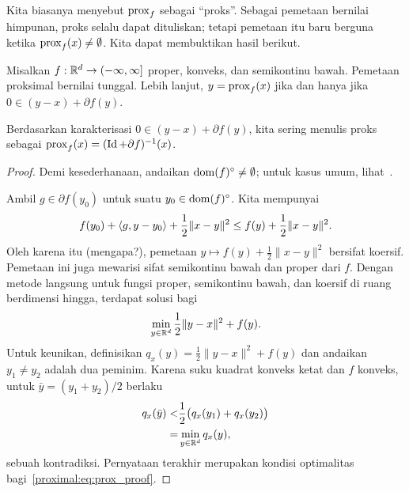 Kita biasanya menyebut \(\mathrm{prox}_f\) sebagai \enquote{proks}. Sebagai pemetaan bernilai himpunan, proks selalu dapat dituliskan; tetapi pemetaan itu baru berguna ketika \(\mathrm{prox}_f(x)\neq\emptyset\). Kita dapat membuktikan hasil berikut.

\begin{lemma}
    Misalkan \(f:\mathbb{R}^d\rightarrow(-\infty,\infty]\) proper, konveks, dan semikontinu bawah. Pemetaan proksimal bernilai tunggal. Lebih lanjut, \(y=\mathrm{prox}_f(x)\) jika dan hanya jika \(0\in(y-x)+\partial f(y)\).
\end{lemma}
\begin{rem}
    Berdasarkan karakterisasi \(0\in(y-x)+\partial f(y)\), kita sering menulis proks sebagai \(\mathrm{prox}_f(x)=(\operatorname{\mathrm{Id}}+\partial f)^{-1}(x)\).
\end{rem}
\begin{proof}
    Demi kesederhanaan, andaikan \(\operatorname{\mathrm{dom}}(f)^\circ\neq\emptyset\); untuk kasus umum, lihat~\cite{beck2017first}.

    Ambil \(g\in\partial f(y_0)\) untuk suatu \(y_0\in\operatorname{\mathrm{dom}}(f)^\circ\). Kita mempunyai
    \begin{equation}
        f(y_0)+\left\langle g , y-y_0\right\rangle+\frac{1}{2}\|x-y\|^2
        \leq f(y)+\frac{1}{2}\|x-y\|^2.
    \end{equation}
    Oleh karena itu (mengapa?), pemetaan \(y\mapsto f(y)+\frac{1}{2}\|x-y\|^2\) bersifat koersif. Pemetaan ini juga mewarisi sifat semikontinu bawah dan proper dari \(f\). Dengan metode langsung untuk fungsi proper, semikontinu bawah, dan koersif di ruang berdimensi hingga, terdapat solusi bagi
    \begin{equation}\label{proximal:eq:prox_proof}
        \min_{y\in\mathbb{R}^d}\frac{1}{2}\|y-x\|^2+f(y).
    \end{equation}
    Untuk keunikan, definisikan \(q_x(y)=\frac{1}{2}\|y-x\|^2+f(y)\) dan andaikan \(y_1\neq y_2\) adalah dua peminim. Karena suku kuadrat konveks ketat dan \(f\) konveks, untuk \(\bar y=(y_1+y_2)/2\) berlaku
    \begin{equation}
        \begin{aligned}
            q_x(\bar y)
            <&\frac{1}{2}\bigl(q_x(y_1)+q_x(y_2)\bigr)\\
            =&\min_{y\in\mathbb{R}^d}q_x(y),
        \end{aligned}
    \end{equation}
    sebuah kontradiksi. Pernyataan terakhir merupakan kondisi optimalitas bagi~\eqref{proximal:eq:prox_proof}.
\end{proof}

